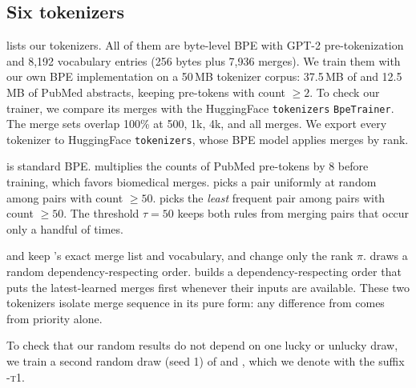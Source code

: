 \subsection{Six tokenizers}
\label{sec:tokenizers}

 lists our tokenizers.
All of them are byte-level BPE with GPT-2 pre-tokenization~\citep{radford2019language} and 8,192 vocabulary entries (256 bytes plus 7,936 merges).
We train them with our own BPE implementation on a 50\,MB tokenizer corpus: 37.5\,MB of \wikitext and 12.5\,MB of PubMed abstracts, keeping pre-tokens with count $\ge 2$.
To check our trainer, we compare its \freq merges with the HuggingFace \texttt{tokenizers} \texttt{BpeTrainer}.
The merge sets overlap 100\% at 500, 1k, 4k, and all merges.
We export every tokenizer to HuggingFace \texttt{tokenizers}, whose BPE model applies merges by rank.

\freq is standard BPE.
\domain multiplies the counts of PubMed pre-tokens by 8 before training, which favors biomedical merges.
\randlearn picks a pair uniformly at random among pairs with count $\ge 50$.
\revlearn picks the \emph{least} frequent pair among pairs with count $\ge 50$.
The threshold $\tau=50$ keeps both rules from merging pairs that occur only a handful of times.

\randorder and \revorder keep \freq's exact merge list and vocabulary, and change only the rank $\pi$.
\randorder draws a random dependency-respecting order.
\revorder builds a dependency-respecting order that puts the latest-learned merges first whenever their inputs are available.
These two tokenizers isolate merge sequence in its pure form: any difference from \freq comes from priority alone.

To check that our random results do not depend on one lucky or unlucky draw, we train a second random draw (seed 1) of \randlearn and \randorder, which we denote with the suffix \textsc{-t1}.

